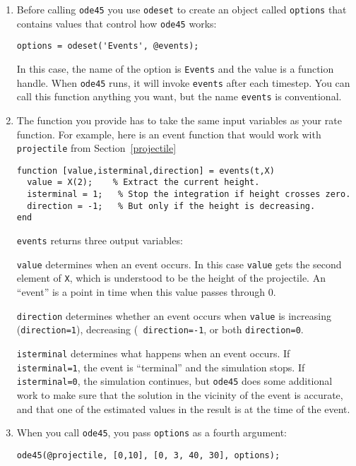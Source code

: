 \begin{enumerate}

\item Before calling {\tt ode45} you use {\tt odeset} to create an
object called {\tt options} that contains values that control
how {\tt ode45} works:

\begin{verbatim}
options = odeset('Events', @events);
\end{verbatim}
%
In this case, the name of the option is {\tt Events} and the
value is a function handle. When {\tt ode45} runs, it will invoke
{\tt events} after each timestep.
You can call this function anything you want, but the name
{\tt events} is conventional.

\item The function you provide has to take
the same input variables as your rate function. For example,
here is an event function that would work with {\tt projectile}
from Section~\ref{projectile}

\begin{verbatim}
function [value,isterminal,direction] = events(t,X)
  value = X(2);    % Extract the current height.
  isterminal = 1;   % Stop the integration if height crosses zero.
  direction = -1;   % But only if the height is decreasing.
end
\end{verbatim}

{\tt events} returns three output variables:

{\tt value} determines
when an event occurs. In this case {\tt value} gets the second
element of {\tt X}, which is understood to be the height of the
projectile. An ``event'' is a point in time when this value passes
through 0.

{\tt direction} determines whether an event occurs when
{\tt value} is increasing ({\tt direction=1}), decreasing ({\tt
direction=-1}, or both {\tt direction=0}.

{\tt isterminal} determines what happens when an event
occurs. If {\tt isterminal=1}, the event is ``terminal'' and the
simulation stops. If {\tt isterminal=0}, the simulation continues,
but {\tt ode45} does some additional work to make sure that the
solution in the vicinity of the event is accurate, and that one of the
estimated values in the result is at the time of the event.

\item When you call {\tt ode45}, you pass {\tt options} as a fourth
argument:

\begin{verbatim}
ode45(@projectile, [0,10], [0, 3, 40, 30], options);
\end{verbatim}
%
\end{enumerate}


